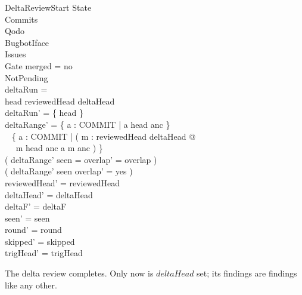 \documentclass{article}
\begin{document}
\begin{schema}{DeltaReviewStart}
  \Delta State \\
  \Xi Commits \\
  \Xi Qodo \\
  \Xi BugbotIface \\
  \Xi Issues \\
  \Xi Gate
\where
  merged = no \\
  NotPending \\
  deltaRun = \emptyset \\
  head \notin reviewedHead \cup deltaHead \\
  deltaRun' = \{ head \} \\
  deltaRange' = \{ a : COMMIT | a \mapsto head \in anc \} \setminus \\
  \quad~ \{ a : COMMIT | ( \exists m : reviewedHead \cup deltaHead @ \\
  \quad~\quad~ m \mapsto head \in anc \land a \mapsto m \in anc ) \} \\
  ( deltaRange' \cap seen = \emptyset \implies overlap' = overlap ) \\
  ( deltaRange' \cap seen \neq \emptyset \implies overlap' = yes ) \\
  reviewedHead' = reviewedHead \\
  deltaHead' = deltaHead \\
  deltaF' = deltaF \\
  seen' = seen \\
  round' = round \\
  skipped' = skipped \\
  trigHead' = trigHead
\end{schema}

The delta review completes. Only now is $deltaHead$ set; its findings are
findings like any other.
\end{document}
